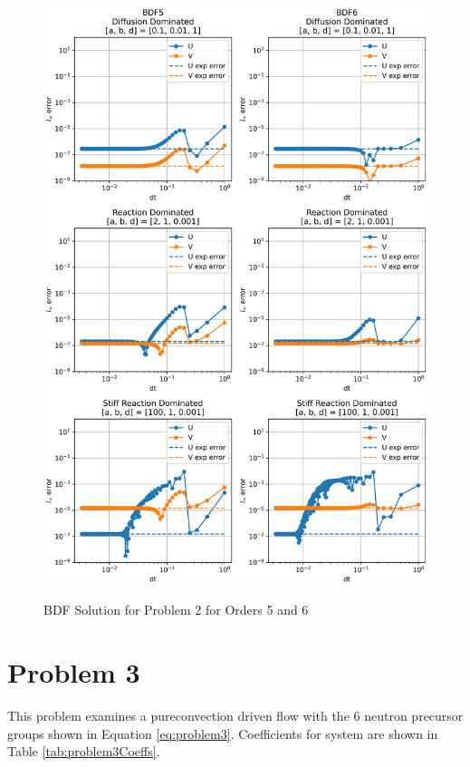\begin{figure}[t]
  \centering
  \includegraphics[width=5.75in]{images/BDF5BDF6problem2.png}\\
  \caption{BDF Solution for Problem 2 for Orders 5 and 6}
  \label{fig:errorProblem2BDF5and6}
\end{figure} 

\FloatBarrier


\section{Problem 3}
This problem examines a pureconvection driven flow with the 6 neutron precursor groups shown in Equation \ref{eq:problem3}. Coefficients for system are shown in Table \ref{tab:problem3Coeffs}. 

